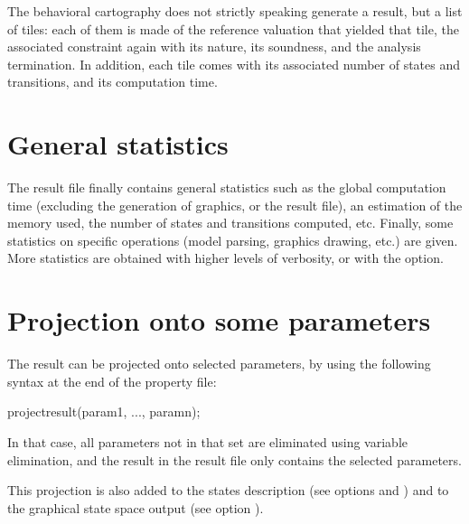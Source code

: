 The behavioral cartography does not strictly speaking generate a result, but a list of tiles: each of them is made of the reference valuation that yielded that tile, the associated constraint again with its nature, its soundness, and the analysis termination.
In addition, each tile comes with its associated number of states and transitions, and its computation time.



\section{General statistics}

The result file finally contains general statistics such as the global computation time (excluding the generation of graphics, or the result file), an estimation of the memory used, the number of states and transitions computed, etc.
Finally, some statistics on specific operations (model parsing, graphics drawing, etc.) are given.
More statistics are obtained with higher levels of verbosity, or with the  option.

\section{Projection onto some parameters}\label{section:projection}
The result can be projected onto selected parameters, by using the following syntax at the end of the property file:

\begin{IMITATORproperty}
projectresult(param1, ..., paramn);
\end{IMITATORproperty}


In that case, all parameters not in that set are eliminated using variable elimination, and the result in the result file only contains the selected parameters.

This projection is also added to the states description (see options  and ) and to the graphical state space output (see option ).






